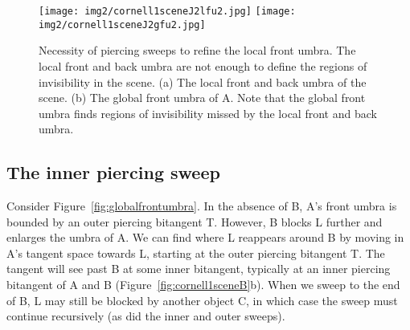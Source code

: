 \documentclass[9pt,twocolumn]{article}
\newif\ifJournal
\begin{document}
\begin{figure}
\begin{center}
\texttt{[image: img2/cornell1sceneJ2lfu2.jpg]}
\texttt{[image: img2/cornell1sceneJ2gfu2.jpg]}
\end{center}
\caption{Necessity of piercing sweeps to refine the local front umbra.
         The local front and back umbra are not enough to define
	 the regions of invisibility in the scene.
         (a) The local front and back umbra of the scene.
         (b) The global front umbra of A.
         Note that the global front umbra finds regions of invisibility
	 missed by the local front and back umbra.}
\label{fig:cornell1sceneJ2}
\end{figure}

\ifJournal
\begin{figure}
\begin{center}
\texttt{[image: img2/cornell1sceneJinner.jpg]}
\texttt{[image: img2/cornell1sceneJBumbra.jpg]}
\end{center}
\caption{ALTERNATIVE EXAMPLE FOR NECESSITY OF GFU, WITH NO PROBLEMS RENDERING
         BACK UMBRA OF B}
\label{fig:cornell1sceneJ}
\end{figure}
\fi




\subsection{The inner piercing sweep}

\ifJournal
Consider Figure~\ref{fig:globalfrontumbra}.
In the absence of B, A's front umbra is bounded by an outer piercing bitangent T.
However, B blocks L further and enlarges the umbra of A.
We can find where L reappears around B by moving in A's tangent space towards L,
starting at the outer piercing bitangent T.
The tangent will see past B at some inner bitangent,
typically at an inner piercing bitangent of A and B (Figure~\ref{fig:cornell1sceneB}b).
When we sweep to the end of B, L may still be blocked by another object C, 
in which case the sweep must continue recursively (as did the inner and outer sweeps).
\end{document}
